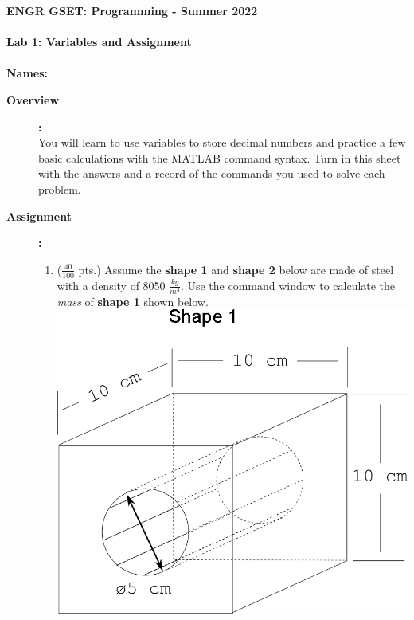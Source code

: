 \documentclass[11pt]{article}
\newcommand{\secNum}{GSET: Programming}
\newcommand{\assnType}{Lab}
\newcommand{\assnTitle}{Variables and Assignment}
\newcommand{\assnNum}{1}
\newcommand{\currTerm}{Summer 2022}
\begin{document}
	\textbf{\LARGE ENGR \hspace{2mm}\secNum \hspace{1mm} - \hspace{1mm} \currTerm} \\\\
	\textbf{\LARGE \assnType \hspace{1mm}  \assnNum : \assnTitle} \\\\
	\textbf{Names:\underline{\hspace{140mm}} } \\
	\begin{description}

		\item [\textbf{ \large Overview}] \textbf{ \Large :}\\
			You will learn to use variables to store decimal numbers and practice a few basic calculations with the MATLAB command syntax. Turn in this sheet with the answers and a record of the commands you used to solve each problem.

        \item [\textbf{ \large Assignment}] \textbf{ \Large :}
            \begin{enumerate}
            \item ($\frac{40}{100}$ pts.)
            Assume the {\bf shape 1} and {\bf shape 2} below are made of steel with a density of 8050 $\frac{kg}{m^3}$. Use the command window to calculate the {\it mass} of {\bf shape 1} shown below.\\
            
            	\includegraphics[scale=.25]{images/lab1_fig1.png}\\
               

\end{enumerate}
\end{description}
\end{document}
